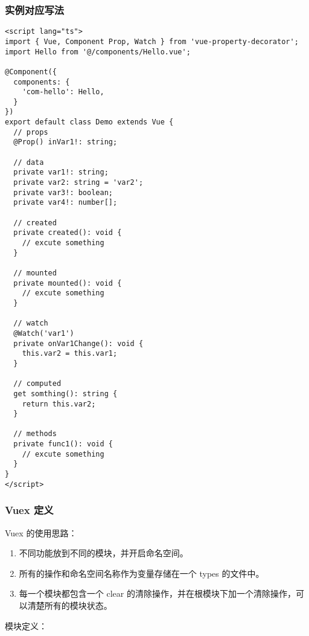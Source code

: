 \subsubsection{实例对应写法}\label{ux5b9eux4f8bux5bf9ux5e94ux5199ux6cd5}

\begin{lstlisting}
<script lang="ts">
import { Vue, Component Prop, Watch } from 'vue-property-decorator';
import Hello from '@/components/Hello.vue';

@Component({
  components: {
    'com-hello': Hello,
  }
})
export default class Demo extends Vue {
  // props
  @Prop() inVar1!: string;

  // data
  private var1!: string;
  private var2: string = 'var2';
  private var3!: boolean;
  private var4!: number[];

  // created
  private created(): void {
    // excute something
  }

  // mounted
  private mounted(): void {
    // excute something
  }

  // watch
  @Watch('var1')
  private onVar1Change(): void {
    this.var2 = this.var1;
  }

  // computed
  get somthing(): string {
    return this.var2;
  }

  // methods
  private func1(): void {
    // excute something
  }
}
</script>
\end{lstlisting}

\subsubsection{Vuex 定义}\label{vuex-ux5b9aux4e49}

Vuex 的使用思路：

\begin{enumerate}
\def\labelenumi{\arabic{enumi}.}
\tightlist
\item
  不同功能放到不同的模块，并开启命名空间。
\item
  所有的操作和命名空间名称作为变量存储在一个 types 的文件中。
\item
  每一个模块都包含一个 clear
  的清除操作，并在根模块下加一个清除操作，可以清楚所有的模块状态。
\end{enumerate}

模块定义：

